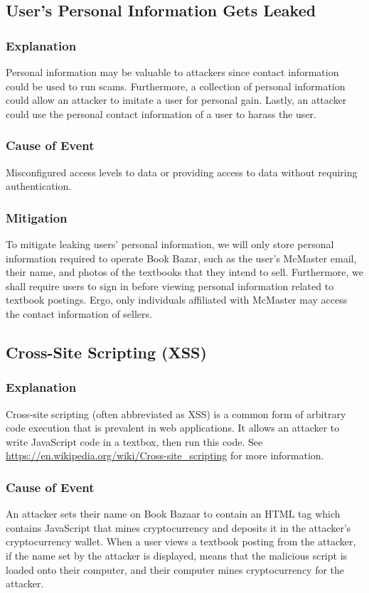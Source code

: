 \documentclass[fullpage]{article}
\begin{document}
\subsection{User's Personal Information Gets Leaked}

\subsubsection*{Explanation}
Personal information may be valuable to attackers since contact information could be used to run scams. Furthermore, a collection of personal information could allow an attacker to imitate a user for personal gain. Lastly, an attacker could use the personal contact information of a user to harass the user.
\subsubsection*{Cause of Event}
Misconfigured access levels to data or providing access to data without requiring authentication.
\subsubsection*{Mitigation}
To mitigate leaking users’ personal information, we will only store personal information required to operate Book Bazar, such as the user’s McMaster email, their name, and photos of the textbooks that they intend to sell. Furthermore, we shall require users to sign in before viewing personal information related to textbook postings. Ergo, only individuals affiliated with McMaster may access the contact information of sellers.

\subsection{Cross-Site Scripting (XSS)}

\subsubsection*{Explanation}
Cross-site scripting (often abbreviated as XSS) is a common form of arbitrary code execution that is prevalent in web applications. It allows an attacker to write JavaScript code in a textbox, then run this code. See \url{https://en.wikipedia.org/wiki/Cross-site_scripting}  for more information.

\subsubsection*{Cause of Event}
An attacker sets their name on Book Bazaar to contain an HTML tag which contains JavaScript that mines cryptocurrency and deposits it in the attacker’s cryptocurrency wallet. When a user views a textbook posting from the attacker, if the name set by the attacker is displayed, means that the malicious script is loaded onto their computer, and their computer mines cryptocurrency for the attacker.
\end{document}
